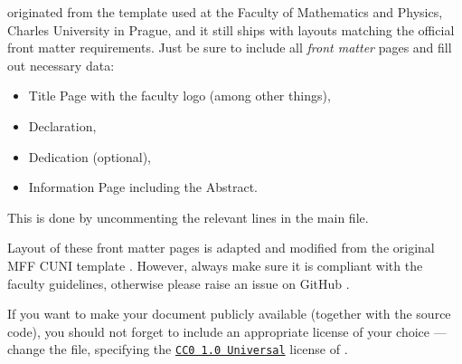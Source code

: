 \begin{remark}
    \TeXtured{} originated from the template used at the Faculty of Mathematics and Physics, Charles University in Prague, and it still ships with layouts matching the official front matter requirements.
    Just be sure to include all \emph{front matter} pages and fill out necessary data:
    \begin{itemize}
        \item \textsf{Title Page} with the faculty logo (among other things),
        \item \textsf{Declaration},
        \item \textsf{Dedication} (optional),
        \item \textsf{Information Page} including the \textsf{Abstract}.
    \end{itemize}
    This is done by uncommenting the relevant lines in the main  file.

    Layout of these front matter pages is adapted and modified from the original MFF CUNI template \autocite{MaresTemplate}.
    However, always make sure it is compliant with the faculty guidelines, otherwise please raise an issue on \textsf{GitHub} \autocite{TeXtured}.
\end{remark}

\begin{remark}[License]
    If you want to make your document publicly available (together with the source code), you should not forget to include an appropriate license of your choice --- change the  file, specifying the \href{https://creativecommons.org/publicdomain/zero/1.0/}{\texttt{CC0 1.0 Universal}} license of \TeXtured{}.
\end{remark}
